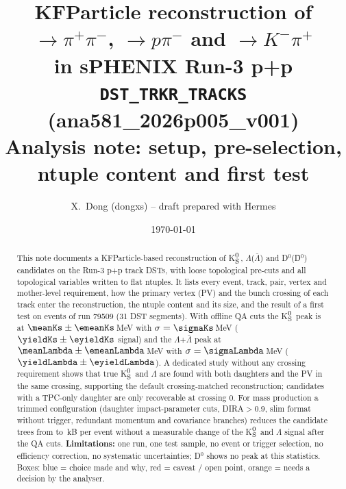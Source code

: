 \documentclass[11pt,a4paper]{article}
\title{KFParticle reconstruction of \Ks$\to\pi^+\pi^-$, \Lam$\to p\pi^-$ and \Dzero$\to K^-\pi^+$\\
in sPHENIX Run-3 p+p \texttt{DST\_TRKR\_TRACKS} (ana581\_2026p005\_v001)\\[4pt]
\large Analysis note: setup, pre-selection, ntuple content and first test}
\author{X.~Dong (dongxs) \quad -- \quad draft prepared with Hermes}
\date{\today}
\newcommand{\Ks}{K$^0_{\rm S}$}
\newcommand{\Lam}{$\Lambda$}
\newcommand{\aLam}{$\bar{\Lambda}$}
\newcommand{\Dzero}{D$^0$}
\begin{document}
\maketitle

\begin{abstract}
\noindent
This note documents a KFParticle-based reconstruction of \Ks, \Lam(\aLam) and \Dzero(\={D}$^0$)
candidates on the Run-3 p+p track DSTs, with loose topological pre-cuts and all topological
variables written to flat ntuples. It lists every event, track, pair, vertex and mother-level
requirement, how the primary vertex (PV) and the bunch crossing of each track enter the
reconstruction, the ntuple content and its size, and the result of a first test on
\nEvents{} events of run 79509 (31 DST segments). With offline QA cuts the \Ks{} peak is at
$\meanKs\pm\emeanKs$\,MeV with $\sigma=\sigmaKs$\,MeV ($\yieldKs\pm\eyieldKs$ signal) and
the \Lam+\aLam{} peak at $\meanLambda\pm\emeanLambda$\,MeV with $\sigma=\sigmaLambda$\,MeV
($\yieldLambda\pm\eyieldLambda$). A dedicated study without any crossing requirement shows
that true \Ks{} and \Lam{} are found with both daughters and the PV in the same crossing,
supporting the default crossing-matched reconstruction; candidates with a TPC-only daughter are
only recoverable at crossing 0.
For mass production a trimmed configuration (daughter impact-parameter cuts, DIRA$>0.9$, slim
format without trigger, redundant momentum and covariance branches) reduces the candidate trees from
\trimKBLoose{} to \trimKBDira\,kB per event without a measurable change of the \Ks{} and \Lam{}
signal after the QA cuts.
\textbf{Limitations:} one run, one test sample, no event or trigger selection, no
efficiency correction, no systematic uncertainties; \Dzero{} shows no peak at this statistics.
Boxes: \textcolor{blue!60!black}{blue} = choice made and why,
\textcolor{red!60!black}{red} = caveat / open point,
\textcolor{orange!80!black}{orange} = needs a decision by the analyser.
\end{abstract}

\tableofcontents
\clearpage












\end{document}
